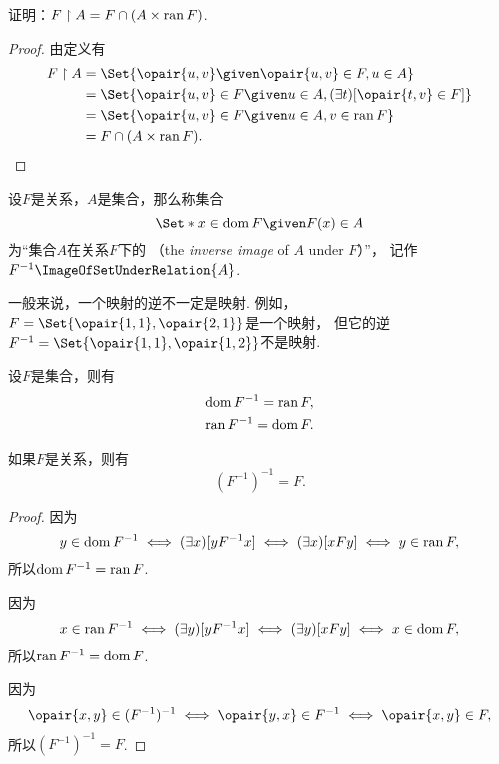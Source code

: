 \begin{example}
证明：\(F \upharpoonright A = F \cap (A \times \operatorname{ran} F)\).
\begin{proof}
由定义有\begin{align*}
	F \SetRestrict A
	&= \Set{
		\opair{u,v}
		\given
		\opair{u,v} \in F,
		u \in A
	} \\
	&= \Set{
		\opair{u,v} \in F
		\given
		u \in A,
		(\exists t)[\opair{t,v} \in F]
	} \\
	&= \Set{
		\opair{u,v} \in F
		\given
		u \in A,
		v \in \ran F
	} \\
	&= F \cap (A \times \ran F).
	\qedhere
\end{align*}
\end{proof}
\end{example}

\begin{definition}
设\(F\)是关系，\(A\)是集合，那么称集合\[
	\Set*{ x \in \dom F \given F(x) \in A }
\]为“集合\(A\)在关系\(F\)下的%
（the \emph{inverse image} of \(A\) under \(F\)）”，
记作\(F^{-1}\ImageOfSetUnderRelation{A}\).
\end{definition}

一般来说，一个映射的逆不一定是映射.
例如，\(F=\Set{ \opair{1,1},\opair{2,1} }\)是一个映射，
但它的逆\(F^{-1}=\Set{ \opair{1,1},\opair{1,2} }\)不是映射.

\begin{theorem}\label{theorem:集合论.关系的逆的定义域值域以及关系的二重逆}
设\(F\)是集合，则有\begin{gather}
	\operatorname{dom} F^{-1} = \operatorname{ran} F, \\
	\operatorname{ran} F^{-1} = \operatorname{dom} F.
\end{gather}

如果\(F\)是关系，则有\begin{equation}
	(F^{-1})^{-1} = F.
\end{equation}
\begin{proof}
因为\[
	y \in \operatorname{dom} F^{-1}
	\iff
	(\exists x)[yF^{-1}x]
	\iff
	(\exists x)[xFy]
	\iff
	y \in \operatorname{ran} F,
\]
所以\(\operatorname{dom} F^{-1} = \operatorname{ran} F\).

因为\[
	x \in \operatorname{ran} F^{-1}
	\iff
	(\exists y)[yF^{-1}x]
	\iff
	(\exists y)[xFy]
	\iff
	x \in \operatorname{dom} F,
\]
所以\(\operatorname{ran} F^{-1} = \operatorname{dom} F\).

因为\[
	\opair{x,y} \in (F^{-1})^{-1}
	\iff
	\opair{y,x} \in F^{-1}
	\iff
	\opair{x,y} \in F,
\]
所以\((F^{-1})^{-1} = F\).
\end{proof}
\end{theorem}

